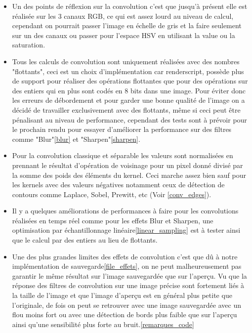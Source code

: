         
        \begin{itemize}
            \item {Un des points de réflexion sur la convolution c'est que jusqu'à présent elle est réalisée sur les 3 canaux RGB, ce qui est assez lourd au niveau de calcul,
            cependant on pourrait passer l'image en échelle de gris et la faire seulement sur un des canaux ou passer pour l'espace HSV en utilisant la value ou la saturation.}
            \item {Tous les calculs de convolution sont uniquement réalisées avec des nombres "flottants", ceci est un choix d'implémentation car renderscript, possède plus de support
            pour réaliser des opérations flottantes que pour des opérations sur des entiers qui en plus sont codés en 8 bits dans une image. Pour éviter donc les erreurs de débordement et pour garder une bonne qualité de l'image
            on a décidé de travailler exclusivement avec des flottants, même si ceci peut être pénalisant au niveau de performance, cependant des tests sont à prévoir pour le prochain rendu pour essayer
            d'améliorer la performance sur des filtres comme "Blur"\ref{blur} et "Sharpen"\ref{sharpen}.}
            \item {Pour la convolution classique et séparable les valeurs sont normalisées en prennant le résultat d'opération de voisinage pour un pixel donné
            divisé par la somme des poids des éléments du kernel. Ceci marche assez bien sauf pour les kernels avec des valeurs négatives notamment ceux de détection de contours comme Laplace, Sobel, Prewitt, etc (Voir \ref{conv_edges}).
            }

            \item {Il y a quelques améliorations de performances à faire pour les convolutions réalisées en temps réel comme pour les effets Blur et Sharpen, une optimisation par échantillonnage linéaire\ref{linear_sampling}
            est à tester ainsi que le calcul par des entiers au lieu de flottants.}

            \item {Une des plus grandes limites des effets de convolution c'est que dû à notre implémentation de sauvegarde\ref{file_effets}, on ne peut malheureusement pas garantir le même résultat sur l'image sauvegardée que sur l'aperçu.
            Vu que la réponse des filtres de convolution sur une image précise sont fortement liés à la taille de l’image et que l'image d'aperçu est en général plus petite que l'originale, de fois on peut se retrouver avec une image sauvegardée avec un flou moins fort ou avec une détection de bords plus faible que sur l'aperçu
            ainsi qu'une sensibilité plus forte au bruit.\ref{remarques_code}}
        \end{itemize} 

